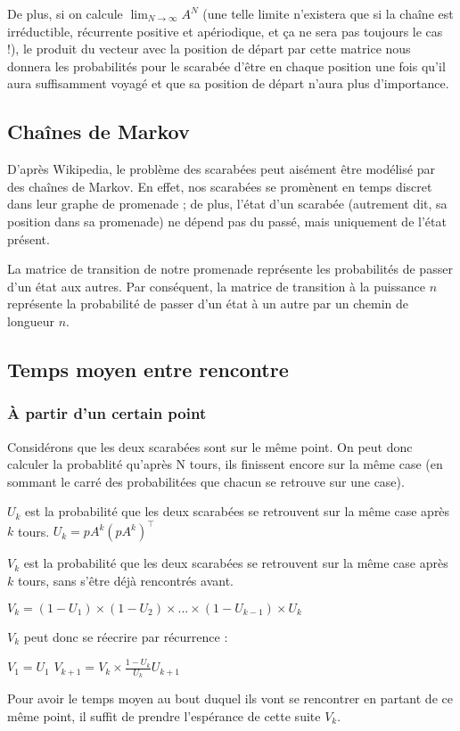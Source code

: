 \documentclass{scrartcl} \usepackage[utf8]{inputenc}
\begin{document}
  De plus, si on calcule $\lim_{N \to \infty} A^N$ (une telle limite
  n'existera que si la chaîne est irréductible, récurrente positive et
  apériodique, et ça ne sera pas toujours le cas !), le produit du
  vecteur avec la position de départ par cette matrice nous donnera
  les probabilités pour le scarabée d'être en chaque position une fois
  qu'il aura suffisamment voyagé et que sa position de départ n'aura
  plus d'importance.

  \subsection{Chaînes de Markov}

  D'après Wikipedia, le problème des scarabées peut aisément être
  modélisé par des chaînes de Markov. En effet, nos scarabées se
  promènent en temps discret dans leur graphe de promenade ; de plus,
  l'état d'un scarabée (autrement dit, sa position dans sa promenade)
  ne dépend pas du passé, mais uniquement de l'état présent.

  La matrice de transition de notre promenade représente les
  probabilités de passer d'un état aux autres. Par conséquent, la
  matrice de transition à la puissance $n$ représente la probabilité
  de passer d'un état à un autre par un chemin de longueur $n$.

\subsection{Temps moyen entre rencontre}

\subsubsection{À partir d'un certain point}

Considérons que les deux scarabées sont sur le même point.
On peut donc calculer la probablité qu'après N tours, ils finissent encore sur la même case (en sommant le carré des probabilitées
que chacun se retrouve sur une case).

$U_k$ est la probabilité que les deux scarabées se retrouvent sur la même case après $k$ tours.
$U_k = pA^k(pA^k)^\intercal$

$V_k$ est la probabilité que les deux scarabées se retrouvent sur la même case après $k$ tours, sans s'être déjà rencontrés avant.

$V_k = (1 - U_1) \times (1 - U_2) \times ... \times (1 - U_{k - 1}) \times U_k$

$V_k$ peut donc se réecrire par récurrence :

$V_1 = U_1$
$V_{k + 1} = V_k \times \frac{1 - U_k}{U_k}U_{k + 1}$

Pour avoir le temps moyen au bout duquel ils vont se rencontrer en partant de ce même point, il suffit de prendre l'espérance de cette suite $V_k$.
\end{document}
